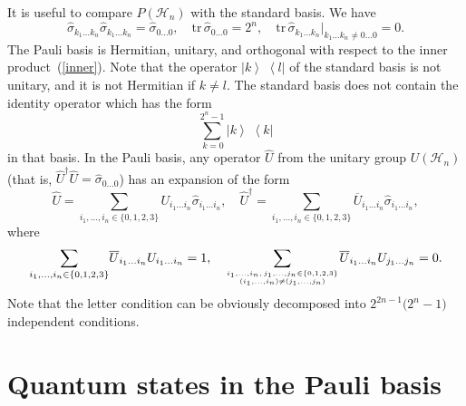 \documentclass[12pt,a4paper,twoside]{article}      %
\newcommand{\ketbra}[2]{{\ensuremath {\left|#1\right\rangle\!\;\!\!\left\langle#2\right|}}}
\begin{document}
It is useful to compare $P(\mathcal{H}_n)$ with the standard basis. We have
\begin{equation}\label{basis-prop}
\hat{\sigma}_{k_1\ldots{}k_n} \hat{\sigma}_{k_1\ldots{}k_n}= \hat{\sigma}_{0\ldots0},\quad \mathrm{tr}\,\hat{\sigma}_{0\ldots{}0}= 2^n,
\quad
\mathrm{tr}\,\hat{\sigma}_{k_1\ldots{}k_n} \big|_{{k_1\ldots{}k_n}\neq0\ldots{}0}= 0.
\end{equation}
The Pauli basis is Hermitian, unitary, and orthogonal with respect to the inner product~(\ref{inner}). Note that the operator $\ketbra kl$ of the standard basis is not unitary, and it is not Hermitian if $k\neq{}l$. The standard basis does not contain the identity operator which has the form
\begin{equation}\label{}
\sum\limits^{2^n\!-1}_{\,k=0}\ketbra{k}{k}
\nonumber
\end{equation}
in that basis. In the Pauli basis, any operator $\hat{U}$ from the unitary group $U(\mathcal{H}_n)$ (that is, $\hat{U}^\dag\hat{U}=\hat{\sigma}_{0\ldots0}$) has an expansion of the form
\begin{equation}\label{}
\hat{U}=\sum\limits_{i_1,\ldots,i_n\in\{0,1,2,3\}} U_{i_1\ldots{}i_n} \hat{\sigma}_{i_1\ldots{}i_n},
\quad
\hat{U}^\dag= \sum\limits_{i_1,\ldots,i_n\in\{0,1,2,3\}} \overline{U}_{i_1\ldots{}i_n} \hat{\sigma}_{i_1\ldots{}i_n},
\nonumber
\end{equation}
where
\begin{equation}\label{}
\sum\limits_{i_1,\ldots,i_n\in\{0,1,2,3\}}\! \overline{U}_{i_1\ldots{}i_n}U_{i_1\ldots{}i_n}=1,
\quad
\sum\limits_ {{i_1,\ldots,i_n,}\,
{j_1,\ldots,j_n\in\{0,1,2,3\}} \atop {(i_1,\ldots,i_n)\neq(j_1,\ldots,j_n)}}\!
\overline{U}_{i_1\ldots{}i_n} U_{j_1\ldots{}j_n}=0.
\nonumber
\end{equation}
Note that the letter condition can be obviously decomposed into $2^{2n-1}\big(2^n-1\big)$ independent conditions.



\section{Quantum states in the Pauli basis}
\label{sec3}
\end{document}

